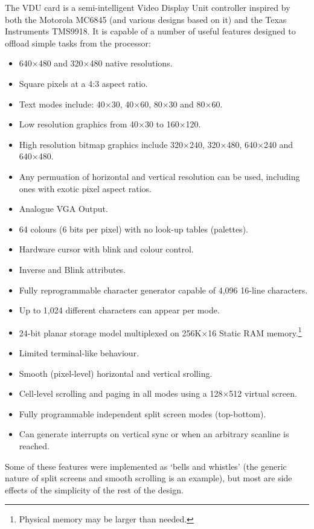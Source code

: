 
\label{chap:hard-vdu}

The VDU card is a semi-intelligent Video Display Unit controller inspired by
both the Motorola MC6845 (and various designs based on it) and the Texas
Instruments TMS9918. It is capable of a number of useful features designed to
offload simple tasks from the processor:

\begin{itemize}
\item 640×480 and 320×480 native resolutions.
\item Square pixels at a 4:3 aspect ratio.
\item Text modes include: 40×30, 40×60, 80×30 and 80×60.
\item Low resolution graphics from 40×30 to 160×120.
\item High resolution bitmap graphics include 320×240, 320×480, 640×240 and
  640×480.
\item Any permuation of horizontal and vertical resolution can be used,
  including ones with exotic pixel aspect ratios.
\item Analogue VGA Output.
\item 64 colours (6 bits per pixel) with no look-up tables (palettes).
\item Hardware cursor with blink and colour control.
\item Inverse and Blink attributes.
\item Fully reprogrammable character generator capable of 4,096 16-line
  characters.
\item Up to 1,024 different characters can appear per mode.
\item 24-bit planar storage model multiplexed on 256K×16 Static RAM memory.\footnote{Physical memory may be larger than needed.}
\item Limited terminal-like behaviour.
\item Smooth (pixel-level) horizontal and vertical srolling.
\item Cell-level scrolling and paging in all modes using a 128×512 virtual
  screen.
\item Fully programmable independent split screen modes (top-bottom).
\item Can generate interrupts on vertical sync or when an arbitrary scanline is
  reached.
\end{itemize}

Some of these features were implemented as ‘bells and whistles’ (the generic
nature of split screens and smooth scrolling is an example), but most are side
effects of the simplicity of the rest of the design.

